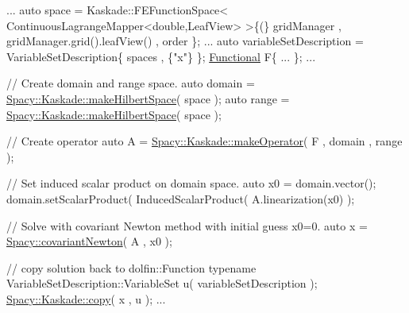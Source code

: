 \begin{DoxyCode}
...
auto space = Kaskade::FEFunctionSpace< ContinuousLagrangeMapper<double,LeafView> >\{(\} gridManager , 
      gridManager.grid().leafView() , order \};
...
auto variableSetDescription = VariableSetDescription\{ spaces , \{\textcolor{stringliteral}{"x"}\} \};
\hyperlink{group__SpacyGroup_ga673218f603c93790864aef12c89d3a35_ga673218f603c93790864aef12c89d3a35}{Functional} F\{ ... \};
...

\textcolor{comment}{// Create domain and range space.}
auto domain = \hyperlink{group__FenicsGroup_ga89defe8c7e08ab224af2a3cd0445e254_ga89defe8c7e08ab224af2a3cd0445e254}{Spacy::Kaskade::makeHilbertSpace}( space );
\textcolor{keyword}{auto} range  = \hyperlink{group__FenicsGroup_ga89defe8c7e08ab224af2a3cd0445e254_ga89defe8c7e08ab224af2a3cd0445e254}{Spacy::Kaskade::makeHilbertSpace}( space );

\textcolor{comment}{// Create operator}
\textcolor{keyword}{auto} A = \hyperlink{group__KaskadeGroup_ga0e8d7d2c51e429e22561ef813fc97589_ga0e8d7d2c51e429e22561ef813fc97589}{Spacy::Kaskade::makeOperator}( F , domain , range );

\textcolor{comment}{// Set induced scalar product on domain space.}
\textcolor{keyword}{auto} x0 = domain.vector();
domain.setScalarProduct( InducedScalarProduct( A.linearization(x0) );

\textcolor{comment}{// Solve with covariant Newton method with initial guess x0=0.}
\textcolor{keyword}{auto} x = \hyperlink{group__NewtonGroup_gab9d1c5b64e93d7ac051f8a7b41bf520a_gab9d1c5b64e93d7ac051f8a7b41bf520a}{Spacy::covariantNewton}( A , x0 );


\textcolor{comment}{// copy solution back to dolfin::Function}
\textcolor{keyword}{typename} VariableSetDescription::VariableSet u( variableSetDescription );
\hyperlink{group__FenicsGroup_ga7f43f0c660d0646adb031b453c536bb0_ga7f43f0c660d0646adb031b453c536bb0}{Spacy::Kaskade::copy}( x , u );
...
\end{DoxyCode}
 